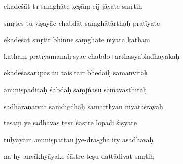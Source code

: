 \documentclass[article,12pt,a4paper]{memoir}%
\newcounter{parCount}
\begin{document}
	  
	  \pstart {} ekadeśāt tu saṃghāte keṣāṃ cij jāyate smṛtiḥ 
	{}
	\pend%
      

	  
	  \pstart \leavevmode%
	smṛtes tu viṣayāc chabdāt saṃghātārthaḥ pratīyate 
	{}
	\pend%
      

	  
	  \pstart {} ekadeśāt smṛtir bhinne saṃghāte niyatā katham 
	{}
	\pend%
      

	  
	  \pstart \leavevmode%
	kathaṃ pratīyamānaḥ syāc chabdo+arthasyābhidhāyakaḥ 
	{}
	\pend%
      

	  
	  \pstart {} ekadeśasarūpās tu tais tair bhedaiḥ samanvitāḥ 
	{}
	\pend%
      

	  
	  \pstart \leavevmode%
	anuniṣpādinaḥ śabdāḥ saṃjñāsu samavasthitāḥ 
	{}
	\pend%
      

	  
	  \pstart {} sādhāraṇatvāt saṃdigdhāḥ sāmarthyān niyatāśrayāḥ 
	{}
	\pend%
      

	  
	  \pstart \leavevmode%
	teṣāṃ ye sādhavas teṣu śāstre lopādi śiṣyate 
	{}
	\pend%
      

	  
	  \pstart {} tulyāyām anuniṣpattau jye-drā-ghā ity asādhavaḥ 
	{}
	\pend%
      

	  
	  \pstart \leavevmode%
	na hy anvākhyāyake śāstre teṣu dattādivat smṛtiḥ 
	{}
	\pend%
      
\end{document}
